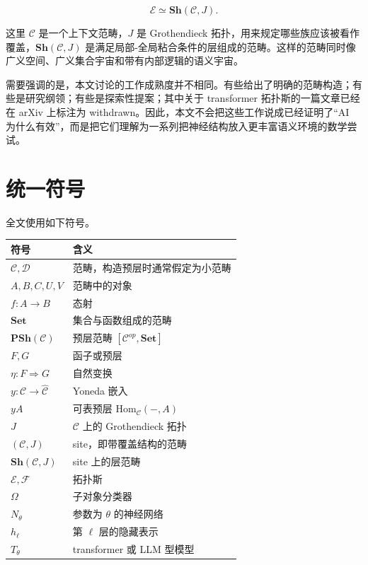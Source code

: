 \documentclass[UTF8,11pt,fontset=none]{ctexart}
\begin{document}
\[
\mathcal{E}\simeq \mathbf{Sh}(\mathcal{C},J).
\]

这里 \(\mathcal{C}\) 是一个上下文范畴，\(J\) 是 Grothendieck 拓扑，用来规定哪些族应该被看作覆盖，\(\mathbf{Sh}(\mathcal{C},J)\) 是满足局部-全局粘合条件的层组成的范畴。这样的范畴同时像广义空间、广义集合宇宙和带有内部逻辑的语义宇宙。


需要强调的是，本文讨论的工作成熟度并不相同。有些给出了明确的范畴构造；有些是研究纲领；有些是探索性提案；其中关于 transformer 拓扑斯的一篇文章已经在 arXiv 上标注为 withdrawn。因此，本文不会把这些工作说成已经证明了“AI 为什么有效”，而是把它们理解为一系列把神经结构放入更丰富语义环境的数学尝试。


\section{统一符号}

全文使用如下符号。


\begin{longtable}{>{\raggedright\arraybackslash}p{}>{\raggedright\arraybackslash}p{}}
\toprule
符号 & 含义 \\
\midrule
\endhead
\(\mathcal{C},\mathcal{D}\) & 范畴，构造预层时通常假定为小范畴 \\
\(A,B,C,U,V\) & 范畴中的对象 \\
\(f:A\to B\) & 态射 \\
\(\mathbf{Set}\) & 集合与函数组成的范畴 \\
\(\mathbf{PSh}(\mathcal{C})\) & 预层范畴 \([\mathcal{C}^{op},\mathbf{Set}]\) \\
\(F,G\) & 函子或预层 \\
\(\eta:F\Rightarrow G\) & 自然变换 \\
\(y:\mathcal{C}\to\widehat{\mathcal{C}}\) & Yoneda 嵌入 \\
\(yA\) & 可表预层 \(\mathrm{Hom}_{\mathcal{C}}(-,A)\) \\
\(J\) & \(\mathcal{C}\) 上的 Grothendieck 拓扑 \\
\((\mathcal{C},J)\) & site，即带覆盖结构的范畴 \\
\(\mathbf{Sh}(\mathcal{C},J)\) & site 上的层范畴 \\
\(\mathcal{E},\mathcal{F}\) & 拓扑斯 \\
\(\Omega\) & 子对象分类器 \\
\(N_\theta\) & 参数为 \(\theta\) 的神经网络 \\
\(h_\ell\) & 第 \(\ell\) 层的隐藏表示 \\
\(T_\theta\) & transformer 或 LLM 型模型 \\
\bottomrule
\end{longtable}
\end{document}
